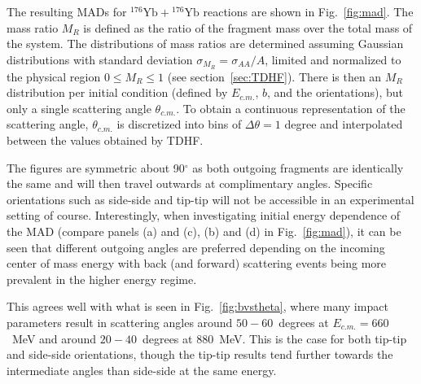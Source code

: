 The resulting MADs for $^{176}\mathrm{Yb}+{}^{176}\mathrm{Yb}$ reactions are shown in Fig.~\ref{fig:mad}.
The mass ratio $M_R$ is defined as the ratio of the fragment mass over the total mass of the system. 
The distributions of mass ratios are determined assuming Gaussian distributions with standard deviation $\sigma_{M_R}=\sigma_{AA}/A$, limited and normalized to the physical region $0\le M_R\le1$ (see section~\ref{sec:TDHF}). 
There is then an $M_R$ distribution per initial condition (defined by $E_{c.m.}$, $b$, and the orientations), but only a single scattering angle $\theta_{c.m.}$.
To obtain a continuous representation of the scattering angle, $\theta_{c.m.}$ is discretized into bins of $\Delta\theta=1$ degree and interpolated between the values obtained by TDHF.



The figures are symmetric about 90$^{\circ}$ as both outgoing fragments are identically the same and will then travel outwards at complimentary angles.
Specific orientations such as side-side and tip-tip will not be accessible in an experimental setting of course.
Interestingly, when investigating initial energy dependence of the MAD (compare panels (a) and (c), (b) and (d) in Fig.~\ref{fig:mad}), 
it can be seen that different outgoing angles are preferred depending on the incoming center of mass energy with back (and forward) scattering events being more prevalent in the higher energy regime.

This  agrees well with what is seen in Fig.~\ref{fig:bvstheta}, where many impact parameters result in  scattering angles around $50-60$~degrees at $E_{c.m.}=660$~MeV and around $20-40$~degrees at 880~MeV.
This is the case for both tip-tip and side-side orientations, though the tip-tip results tend further towards the intermediate angles than side-side at the same energy.

